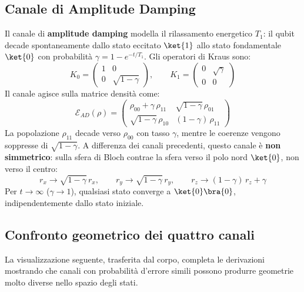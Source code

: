 \subsection{Canale di Amplitude Damping}

Il canale di \textbf{amplitude damping} modella il rilassamento energetico $T_1$: il qubit decade spontaneamente dallo stato eccitato $\ket{1}$ allo stato fondamentale $\ket{0}$ con probabilità $\gamma = 1-e^{-t/T_1}$. Gli operatori di Kraus sono:
\begin{equation}
    K_0 = \begin{pmatrix}1 & 0 \\ 0 & \sqrt{1-\gamma}\end{pmatrix}, \qquad
    K_1 = \begin{pmatrix}0 & \sqrt{\gamma} \\ 0 & 0\end{pmatrix}
    \label{eq:kraus_ad}
\end{equation}
Il canale agisce sulla matrice densità come:
\begin{equation}
    \mathcal{E}_{AD}\!(\rho) = \begin{pmatrix}
        \rho_{00} + \gamma\,\rho_{11} & \sqrt{1-\gamma}\,\rho_{01} \\
        \sqrt{1-\gamma}\,\rho_{10}   & (1-\gamma)\,\rho_{11}
    \end{pmatrix}
    \label{eq:amp_damping_explicit}
\end{equation}
La popolazione $\rho_{11}$ decade verso $\rho_{00}$ con tasso $\gamma$, mentre le coerenze vengono soppresse di $\sqrt{1-\gamma}$. A differenza dei canali precedenti, questo canale è \textbf{non simmetrico}: sulla sfera di Bloch contrae la sfera verso il polo nord $\ket{0}$, non verso il centro:
\begin{equation}
    r_x \to \sqrt{1-\gamma}\,r_x, \qquad r_y \to \sqrt{1-\gamma}\,r_y, \qquad r_z \to (1-\gamma)\,r_z + \gamma
\end{equation}
Per $t \to \infty$ ($\gamma \to 1$), qualsiasi stato converge a $\ket{0}\bra{0}$, indipendentemente dallo stato iniziale.

\subsection{Confronto geometrico dei quattro canali}

La visualizzazione seguente, trasferita dal corpo, completa le derivazioni
mostrando che canali con probabilità d'errore simili possono produrre geometrie
molto diverse nello spazio degli stati.

